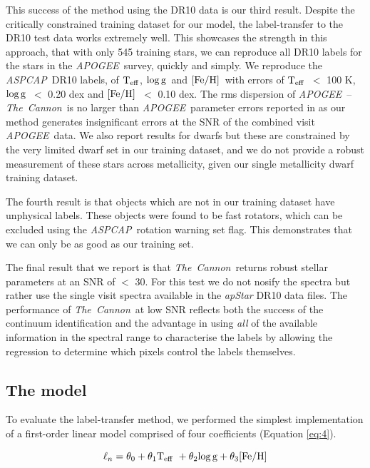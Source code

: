 \documentclass[12pt, preprint]{aastex}
\newcommand{\teff}{\mbox{$\rm T_{eff}$}}
\newcommand{\feh}{\mbox{$\rm [Fe/H]$}}
\newcommand{\logg}{\mbox{$\rm \log g$}}
\newcommand{\tc}{\textsl{The~Cannon}}
\newcommand{\apogee}{\textsl{APOGEE}}
\newcommand{\aspcap}{\textsl{ASPCAP}}
\begin{document}
This success of the method using the DR10 data is our third result.  Despite the critically constrained training dataset for our model, the label-transfer to the DR10 test data works extremely well. This showcases the strength in this approach, that with only 545 training stars, we can reproduce all DR10 labels for the stars in the \apogee\ survey, quickly and simply.  
We reproduce the \aspcap\ DR10 labels, of \teff, \logg\ and \feh\ with errors of \teff\ $<$ 100 K, \logg\ $<$ 0.20 dex and \feh\ $<$ 0.10 dex. The rms dispersion of \apogee\ -- \tc\ is no larger than \apogee\ parameter errors reported in \citep{Meszaros2013} as our method generates insignificant errors at the SNR of the combined visit \apogee\ data. We also report results for dwarfs but these are constrained by the very limited dwarf set in our training dataset, and we do not provide a robust measurement of these stars across metallicity, given our single metallicity dwarf training dataset.

The fourth result is that objects which are not in our training dataset have unphysical labels. These objects were found to be fast rotators, which can be excluded using the \aspcap\ rotation warning set flag. This demonstrates that we can only be as good as our training set. 

The final result that we report is that \tc\ returns robust stellar parameters at an SNR of $<$ 30. For this test we do not nosify the spectra but rather use the single visit spectra available in the \textit{apStar} DR10 data files. The performance of \tc\ at low SNR reflects both the success of the continuum identification and the advantage in using \textit{all} of the available information in the spectral range to characterise the labels by allowing the regression to determine which pixels control the labels themselves.


\subsection{The model} 

To evaluate the label-transfer method, we performed the simplest implementation of a first-order linear model comprised of four coefficients (Equation \ref{eq:4}). 

\begin{equation}
\ell_n = \theta_0 + \theta_1 \teff\ + \theta_2 \logg + \theta_3 \feh 
 \label{eq:4}
 \end{equation}
\end{document}
